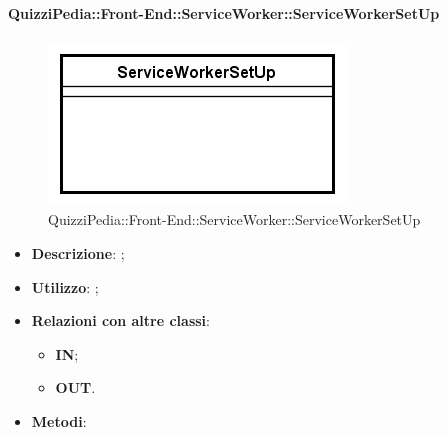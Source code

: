 \paragraph[QuizziPedia::Front-End::ServiceWorker::ServiceWorkerSetUp]{QuizziPedia::Front-End::ServiceWorker::ServiceWorkerSetUp}
\begin{figure} [ht]
	\centering
	\includegraphics[scale=0.80]{UML/Classi/Front-End/QuizziPedia_Front-End_ServiceWorker_ServiceWorkerSetUp.png}
	\caption{QuizziPedia::Front-End::ServiceWorker::ServiceWorkerSetUp}
\end{figure} \FloatBarrier
\begin{itemize}
	\item \textbf{Descrizione}: ;
	\item \textbf{Utilizzo}: ;
	\item \textbf{Relazioni con altre classi}:
	\begin{itemize}
		\item \textbf{IN};
		\item \textbf{OUT}.
	\end{itemize}
	\item \textbf{Metodi}:
\end{itemize}

